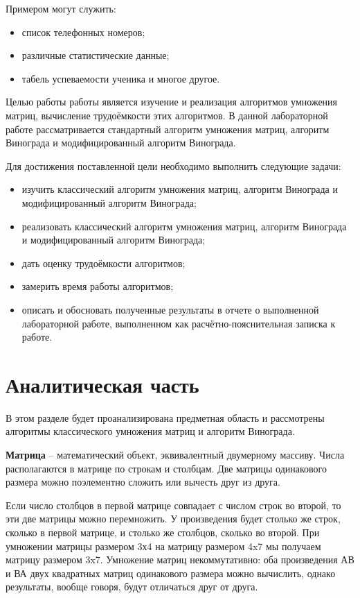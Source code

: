 \documentclass[12pt]{report}
\begin{document}
	Примером могут служить:
	
	\begin{itemize}
		\item список телефонных номеров;
		\item различные статистические данные;
		\item табель успеваемости ученика и многое другое.
	\end{itemize}
	
	Целью работы работы является изучение и реализация алгоритмов умножения матриц, вычисление трудоёмкости этих алгоритмов. В данной лабораторной работе рассматривается стандартный алгоритм умножения матриц, алгоритм Винограда и модифицированный алгоритм Винограда.
	\newline
	
	Для достижения поставленной цели необходимо выполнить следующие задачи:
	\begin{itemize}
		\item изучить классический алгоритм умножения матриц, алгоритм Винограда и модифицированный алгоритм Винограда;
		\item реализовать классический алгоритм умножения матриц, алгоритм Винограда и модифицированный алгоритм Винограда;
		\item дать оценку трудоёмкости алгоритмов;
		\item замерить время работы алгоритмов;
		\item описать и обосновать полученные результаты в отчете о выполненной лабораторной
		работе, выполненном как расчётно-пояснительная записка к работе. 
	\end{itemize}
	
	\chapter{Аналитическая часть}
	
	В этом разделе будет проанализирована предметная область и рассмотрены алгоритмы классического умножения матриц и алгоритм Винограда.
	\newline
	
	\textbf{Матрица} – математический объект, эквивалентный двумерному массиву. Числа располагаются в матрице по строкам и столбцам. Две матрицы одинакового размера можно поэлементно сложить или вычесть друг из друга.
	\newline
	
	Если число столбцов в первой матрице совпадает с числом строк во второй, то эти две матрицы можно перемножить. У произведения будет столько же строк, сколько в первой матрице, и столько же столбцов, сколько во второй. При умножении матрицы размером 3х4 на матрицу размером 4x7 мы получаем матрицу размером 3x7. Умножение матриц некоммутативно: оба произведения АВ и ВА двух квадратных матриц одинакового размера можно вычислить, однако результаты, вообще говоря, будут отличаться друг от друга.
	
\end{document}
